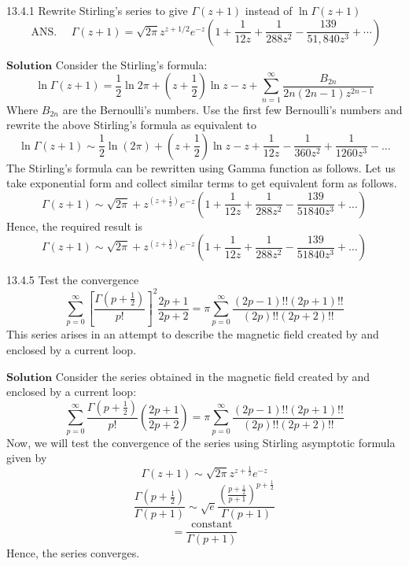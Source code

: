 \documentclass{article}
\begin{document}
\begin{flushleft}


\begin{mybox}{13.4.1}
Rewrite Stirling's series to give $\Gamma(z+1)$ instead of $\ln \Gamma(z+1)$
$$
\text { ANS. } \quad \Gamma(z+1)=\sqrt{2 \pi} z^{z+1 / 2} e^{-z}\left(1+\frac{1}{12 z}+\frac{1}{288 z^{2}}-\frac{139}{51,840 z^{3}}+\cdots\right)
$$
\end{mybox}
$\boxed{\textbf{Solution}}$ Consider the Stirling's formula: 
$$\ln \Gamma(z+1)=\frac{1}{2} \ln 2 \pi+\left(z+\frac{1}{2}\right) \ln z-z+\sum_{n=1}^{\infty} \frac{B_{2 n}}{2 n(2 n-1) z^{2 n-1}}$$
Where $B_{2 n}$ are the Bernoulli's numbers. Use the first few Bernoulli's numbers and rewrite the above Stirling's formula as equivalent to
$$\ln \Gamma(z+1) \sim \frac{1}{2} \ln (2 \pi)+\left(z+\frac{1}{2}\right) \ln z-z+\frac{1}{12 z}-\frac{1}{360 z^{2}}+\frac{1}{1260 z^{3}}-\ldots$$
The Stirling's formula can be rewritten using Gamma function as follows.
Let us take exponential form and collect similar terms to get equivalent form as follows.
$$
\Gamma(z+1) \sim \sqrt{2 \pi}+z^{\left(z+\frac{1}{2}\right)} e^{-z}\left(1+\frac{1}{12 z}+\frac{1}{288 z^{2}}-\frac{139}{51840 z^{3}}+\ldots\right)
$$
Hence, the required result is $$\Gamma(z+1) \sim \sqrt{2 \pi}+z^{\left(z+\frac{1}{2}\right)} e^{-z}\left(1+\frac{1}{12 z}+\frac{1}{288 z^{2}}-\frac{139}{51840 z^{3}}+\ldots\right)$$


\begin{mybox}{13.4.5}
Test the convergence
$$
\sum_{p=0}^{\infty}\left[\frac{\Gamma\left(p+\frac{1}{2}\right)}{p !}\right]^{2} \frac{2 p+1}{2 p+2}=\pi \sum_{p=0}^{\infty} \frac{(2 p-1) ! !(2 p+1) ! !}{(2 p) ! !(2 p+2) ! !}
$$
This series arises in an attempt to describe the magnetic field created by and enclosed by a current loop.
\end{mybox}
$\boxed{\textbf{Solution}}$ Consider the series obtained in the magnetic field created by and enclosed by a current loop:
$$
\sum_{p=0}^{\infty} \frac{\Gamma\left(p+\frac{1}{2}\right)}{p !}\left(\frac{2 p+1}{2 p+2}\right)=\pi \sum_{p=0}^{\infty} \frac{(2 p-1) ! !(2 p+1) ! !}{(2 p) ! !(2 p+2) ! !}
$$
Now, we will test the convergence of the series using Stirling asymptotic formula given by
$$
\Gamma(z+1) \sim \sqrt{2 \pi} z^{z+\frac{1}{2}} e^{-z}
$$
$$
\frac{\Gamma\left(p+\frac{1}{2}\right)}{\Gamma(p+1)} \sim \sqrt{e} \frac{\left(\frac{p+\frac{1}{2}}{p+1}\right)^{p+\frac{1}{2}}}{\Gamma(p+1)}
$$
$$
=\frac{\text { constant }}{\Gamma(p+1)}
$$
Hence, the series converges.




\end{flushleft}
\end{document}
